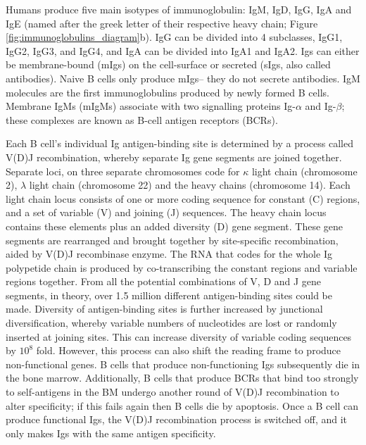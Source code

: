 Humans produce five main isotypes of immunoglobulin: IgM, IgD, IgG, IgA and IgE (named after the greek letter of their respective heavy chain; Figure \ref{fig:immunoglobulins_diagram}b).
IgG can be divided into 4 subclasses, IgG1, IgG2, IgG3, and IgG4, and IgA can be divided into IgA1 and IgA2\cite{schroeder2010structure}.
Igs can either be membrane-bound (mIgs) on the cell-surface or secreted (sIgs, also called antibodies).
Naive B cells only produce mIgs-- they do not secrete antibodies.
IgM molecules are the first immunoglobulins produced by newly formed B cells.
Membrane IgMs (mIgMs) associate with two signalling proteins Ig-$\alpha$ and Ig-$\beta$; these complexes are known as B-cell antigen receptors (BCRs)\cite{friess2018structural, dylke2007role}.

Each B cell's individual Ig antigen-binding site is determined by a process called V(D)J recombination, whereby separate Ig gene segments are joined together.
Separate loci, on three separate chromosomes code for $\kappa$ light chain (chromosome 2), $\lambda$ light chain (chromosome 22) and the heavy chains (chromosome 14).
Each light chain locus consists of one or more coding sequence for constant (C) regions, and a set of variable (V) and joining (J) sequences.
The heavy chain locus contains these elements plus an added diversity (D) gene segment.
These gene segments are rearranged and brought together by site-specific recombination, aided by V(D)J recombinase enzyme.
The RNA that codes for the whole Ig polypetide chain is produced by co-transcribing the constant regions and variable regions together.
From all the potential combinations of V, D and J gene segments, in theory, over 1.5 million different antigen-binding sites could be made.
Diversity of antigen-binding sites is further increased by junctional diversification, whereby variable numbers of nucleotides are lost or randomly inserted at joining sites.
This can increase diversity of variable coding sequences by $10^8$ fold.
However, this process can also shift the reading frame to produce non-functional genes.
B cells that produce non-functioning Igs subsequently die in the bone marrow.
Additionally, B cells that produce BCRs that bind too strongly to self-antigens in the BM undergo another round of V(D)J recombination to alter specificity; if this fails again then B cells die by apoptosis.
Once a B cell can produce functional Igs, the V(D)J recombination process is switched off, and it only makes Igs with the same antigen specificity\cite{alberts2007molecularimmune}.

